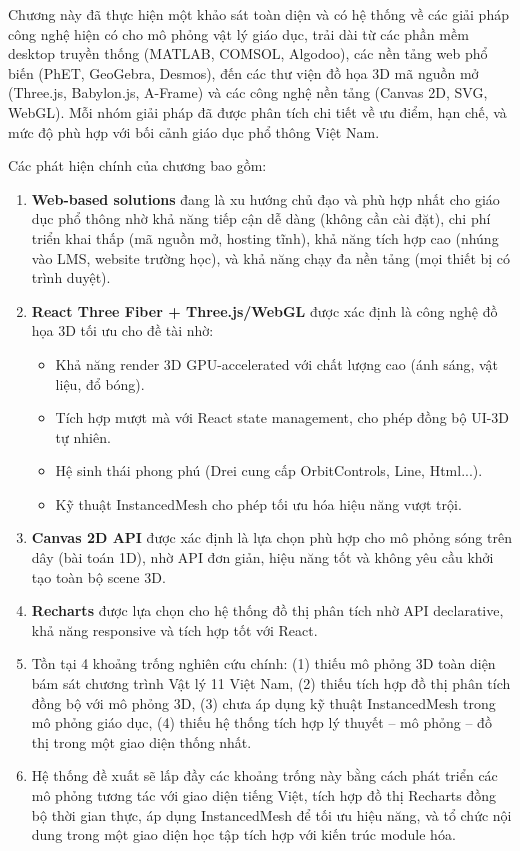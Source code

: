 Chương này đã thực hiện một khảo sát toàn diện và có hệ thống về các giải pháp công nghệ hiện có cho mô phỏng vật lý giáo dục, trải dài từ các phần mềm desktop truyền thống (MATLAB, COMSOL, Algodoo), các nền tảng web phổ biến (PhET, GeoGebra, Desmos), đến các thư viện đồ họa 3D mã nguồn mở (Three.js, Babylon.js, A-Frame) và các công nghệ nền tảng (Canvas 2D, SVG, WebGL). Mỗi nhóm giải pháp đã được phân tích chi tiết về ưu điểm, hạn chế, và mức độ phù hợp với bối cảnh giáo dục phổ thông Việt Nam.

Các phát hiện chính của chương bao gồm:

\begin{enumerate}
    \item \textbf{Web-based solutions} đang là xu hướng chủ đạo và phù hợp nhất cho giáo dục phổ thông nhờ khả năng tiếp cận dễ dàng (không cần cài đặt), chi phí triển khai thấp (mã nguồn mở, hosting tĩnh), khả năng tích hợp cao (nhúng vào LMS, website trường học), và khả năng chạy đa nền tảng (mọi thiết bị có trình duyệt).

    \item \textbf{React Three Fiber + Three.js/WebGL} được xác định là công nghệ đồ họa 3D tối ưu cho đề tài nhờ:
    \begin{itemize}
        \item Khả năng render 3D GPU-accelerated với chất lượng cao (ánh sáng, vật liệu, đổ bóng).
        \item Tích hợp mượt mà với React state management, cho phép đồng bộ UI-3D tự nhiên.
        \item Hệ sinh thái phong phú (Drei cung cấp OrbitControls, Line, Html...).
        \item Kỹ thuật InstancedMesh cho phép tối ưu hóa hiệu năng vượt trội.
    \end{itemize}

    \item \textbf{Canvas 2D API} được xác định là lựa chọn phù hợp cho mô phỏng sóng trên dây (bài toán 1D), nhờ API đơn giản, hiệu năng tốt và không yêu cầu khởi tạo toàn bộ scene 3D.

    \item \textbf{Recharts} được lựa chọn cho hệ thống đồ thị phân tích nhờ API declarative, khả năng responsive và tích hợp tốt với React.

    \item Tồn tại 4 khoảng trống nghiên cứu chính: (1) thiếu mô phỏng 3D toàn diện bám sát chương trình Vật lý 11 Việt Nam, (2) thiếu tích hợp đồ thị phân tích đồng bộ với mô phỏng 3D, (3) chưa áp dụng kỹ thuật InstancedMesh trong mô phỏng giáo dục, (4) thiếu hệ thống tích hợp lý thuyết – mô phỏng – đồ thị trong một giao diện thống nhất.

    \item Hệ thống đề xuất sẽ lấp đầy các khoảng trống này bằng cách phát triển các mô phỏng tương tác với giao diện tiếng Việt, tích hợp đồ thị Recharts đồng bộ thời gian thực, áp dụng InstancedMesh để tối ưu hiệu năng, và tổ chức nội dung trong một giao diện học tập tích hợp với kiến trúc module hóa.
\end{enumerate}


